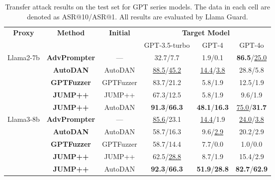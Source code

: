 \renewcommand{\arraystretch}{1.5}
\setlength{\tabcolsep}{6pt} %
\captionsetup[table]{justification=raggedright, singlelinecheck=false}
\begin{table*}[!t]
    \centering
    \small
    \begin{tabular}{cccccc}
        \hline
        \multirow{2}{*}{\textbf{Proxy}} & \multirow{2}{*}{ \textbf{Method}} & \multirow{2}{*}{\textbf{Initial}} & \multicolumn{3}{c}{\textbf{Target Model}}
        \\
        \cline{4-6}
         & &  & GPT-3.5-turbo & GPT-4 & GPT-4o
        \\
        \hline
        \multirow{5}{*}{Llama2-7b} & \small \textbf{AdvPrompter} & --- & 32.7/7.7 & 1.9/0.1 & \textbf{86.5}/\underline{25.0} \\
        & \small \textbf{AutoDAN} & AutoDAN & \underline{88.5}/\underline{45.2} & \underline{14.4}/\underline{3.8} & 28.8/5.8 \\
        & \small \textbf{GPTFuzzer} & GPTFuzzer & 83.7/21.2 & 5.8/1.9 & 12.5/1.9 \\
        & \small \textbf{JUMP++} & JUMP++ & 67.3/12.5 & 5.8/1.9 & 9.6/1.9 \\
        & \small \textbf{JUMP++} & AutoDAN &  \textbf{91.3}/\textbf{66.3} & \textbf{48.1}/\textbf{16.3} & \underline{75.0}/\textbf{31.7} \\
        \hline
        \multirow{5}{*}{Llama3-8b} & \small \textbf{AdvPrompter} & --- & \underline{85.6}/23.1 & \underline{14.4}/1.9 & \underline{24.0}/\underline{3.8} \\
        & \small \textbf{AutoDAN} & AutoDAN &  58.7/16.3 & 9.6/\underline{2.9} & 20.2/2.9 \\
        & \small \textbf{GPTFuzzer} & GPTFuzzer & 58.7/14.4 & 7.7/0.0 & 1.0/0.0  \\
        & \small \textbf{JUMP++} & JUMP++ & 62.5/\underline{28.8} & 8.7/1.9 & 15.4/2.9 \\
        & \small \textbf{JUMP++} & AutoDAN & \textbf{92.3}/\textbf{66.3} & \textbf{51.9}/\textbf{28.8} & \textbf{82.7}/\textbf{62.9} \\
        \hline
    \end{tabular}
    \caption{Transfer attack results on the test set for GPT series models. The data in each cell are denoted as ASR@10/ASR@1. All results are evaluated by Llama Guard.}
    \label{tab:transfer}
\end{table*}